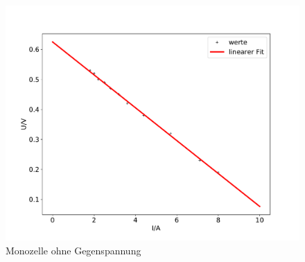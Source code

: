 \begin{figure}[H]
  \centering
  \includegraphics[width=\textwidth]{plotreck.pdf}
  \caption{Monozelle ohne Gegenspannung}
  \label{fig:c}
\end{figure}

